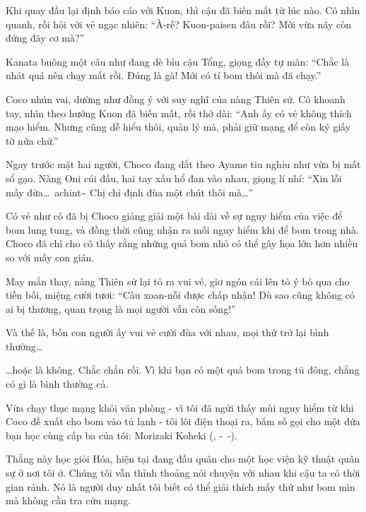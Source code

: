 \documentclass[../main.tex]{subfiles}
\begin{document}

Khi quay đầu lại định báo cáo với Kuon, thì cậu đã biến mất từ lúc nào. Cô nhìn quanh, rồi hỏi với vẻ ngạc nhiên: ``À-rế? Kuon-paisen đâu rồi? Mới vừa nãy còn đứng đây cơ mà?''

Kanata buông một câu như đang dè bỉu cậu Tổng, giọng đầy tự mãn: ``Chắc là nhát quá nên chạy mất rồi. Đúng là gà! Mới có tí bom thôi mà đã chạy.''

Coco nhún vai, dường như đồng ý với suy nghĩ của nàng Thiên sứ. Cô khoanh tay, nhìn theo hướng Kuon đã biến mất, rồi thở dài: ``Anh ấy có vẻ không thích mạo hiểm. Nhưng cũng dễ hiểu thôi, quản lý mà, phải giữ mạng để còn ký giấy tờ nữa chứ.''

Ngay trước mặt hai người, Choco đang dắt theo Ayame tiu nghỉu như vừa bị mất sổ gạo. Nàng Oni cúi đầu, hai tay xấu hổ đan vào nhau, giọng lí nhí: ``Xin lỗi mấy đứa\dots\ achint\~{} Chị chỉ định đùa một chút thôi mà\dots''

Có vẻ như cô đã bị Choco giảng giải một bài dài về sự nguy hiểm của việc để bom lung tung, và đồng thời cũng nhận ra mối nguy hiểm khi để bom trong nhà. Choco đã chỉ cho cô thấy rằng những quả bom nhỏ có thể gây họa lớn hơn nhiều so với mấy con gián.

May mắn thay, nàng Thiên sứ lại tỏ ra vui vẻ, giơ ngón cái lên tỏ ý bỏ qua cho tiền bối, miệng cười tươi: ``Câu xoan-nỗi được chấp nhận! Dù sao cũng không có ai bị thương, quan trọng là mọi người vẫn còn sống!''

Và thế là, bốn con người ấy vui vẻ cười đùa với nhau, mọi thứ trở lại bình thường\dots

\omk


\dots hoặc là không. Chắc chắn rồi. Vì khi bạn có một quả bom trong tủ đông, chẳng có gì là bình thường cả.

Vừa chạy thục mạng khỏi văn phòng - vì tôi đã ngửi thấy mùi nguy hiểm từ khi Coco đề xuất cho bom vào tủ lạnh - tôi lôi điện thoại ra, bấm số gọi cho một đứa bạn học cùng cấp ba của tôi: Morizaki Koheki (, -\ -).

Thằng này học giỏi Hóa, hiện tại đang đầu quân cho một học viện kỹ thuật quân sự ở nơi tôi ở. Chúng tôi vẫn thỉnh thoảng nói chuyện với nhau khi cậu ta có thời gian rảnh. Nó là người duy nhất tôi biết có thể giải thích mấy thứ như bom mìn mà không cần tra cứu mạng.
\end{document}
